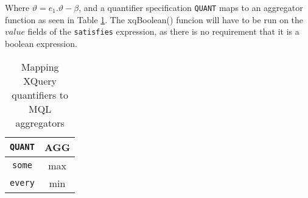Where $\vartheta=e_1.\vartheta-\beta$, and a quantifier specification \texttt{QUANT} maps to an aggregator
function as seen in Table \ref{tab:disc:quant}. The \textsf{xqBoolean()} funcion will have to be run on the
$value$ fields of the \texttt{satisfies} expression, as there is no requirement that it is a boolean expression.

\begin{table}[h]
\centering
\begin{tabular}{c|c} 
\texttt{QUANT} & \textsf{AGG} \\ \hline
\texttt{some} & \textsf{max} \\
\texttt{every} & \textsf{min}
\end{tabular}
\caption{Mapping XQuery quantifiers to MQL aggregators \label{tab:disc:quant}}
\end{table}

